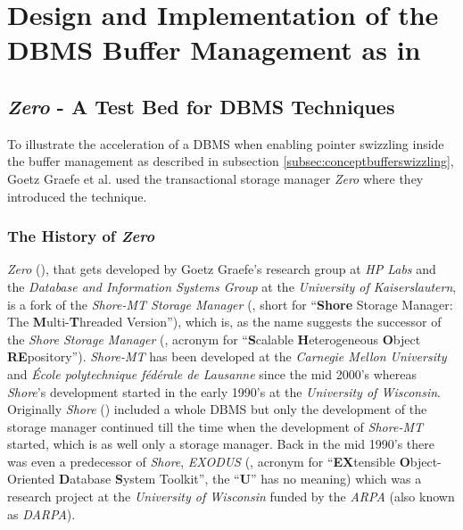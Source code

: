 \section[Design and Implementation of the Buffer Manager]{Design and Implementation of the DBMS Buffer Management as in \cite{Graefe:2014}}

\subsection[\emph{Zero} - The Test Bed]{\emph{Zero} - A Test Bed for DBMS Techniques}

	To illustrate the acceleration of a DBMS when enabling pointer swizzling inside the buffer management as described in subsection \ref{subsec:conceptbufferswizzling}, Goetz Graefe et al. used the transactional storage manager \emph{Zero} where they introduced the technique.
	
\subsubsection[History of \emph{Zero}]{The History of \emph{Zero}}
	
	\emph{Zero} (\cite{Zero}), that gets developed by Goetz Graefe's research group at \emph{HP Labs} and the \emph{Database and Information Systems Group} at the \emph{University of Kaiserslautern}, is a fork of the \emph{Shore-MT Storage Manager} (\cite{ShoreMT}, short for ``\textbf{Shore} Storage Manager: The \textbf{M}ulti-\textbf{T}hreaded Version''), which is, as the name suggests the successor of the \emph{Shore Storage Manager} (\cite{SSM}, acronym for ``\textbf{S}calable \textbf{H}eterogeneous \textbf{O}bject \textbf{RE}pository''). \emph{Shore-MT} has been developed at the \emph{Carnegie Mellon University} and \emph{École polytechnique fédérale de Lausanne} since the mid 2000's whereas \emph{Shore}'s development started in the early 1990's at the \emph{University of Wisconsin}. Originally \emph{Shore} (\cite{Shore}) included a whole DBMS but only the development of the storage manager continued till the time when the development of \emph{Shore-MT} started, which is as well only a storage manager. Back in the mid 1990's there was even a predecessor of \emph{Shore}, \emph{EXODUS} (\cite{EXODUS}, acronym for ``\textbf{EX}tensible \textbf{O}bject-Oriented \textbf{D}atabase \textbf{S}ystem Toolkit'', the ``\textbf{U}'' has no meaning) which was a research project at the \emph{University of Wisconsin} funded by the \emph{ARPA} (also known as \emph{DARPA}).
	
